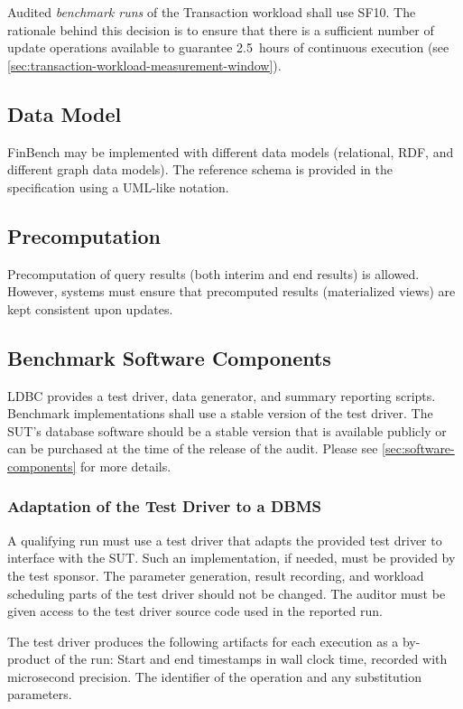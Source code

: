 Audited \emph{benchmark runs} of the Transaction workload shall use SF10. The rationale behind this decision is to ensure that there is a sufficient number of update operations available to guarantee 2.5~hours of continuous execution (see \autoref{sec:transaction-workload-measurement-window}).

\subsection{Data Model}

FinBench may be implemented with different data models (\eg relational, RDF, and different graph data models). The reference schema is provided in the specification using a UML-like notation.

\subsection{Precomputation}

Precomputation of query results (both interim and end results) is allowed. However, systems must ensure that precomputed results (\eg materialized views) are kept consistent upon updates.

\subsection{Benchmark Software Components}
\label{sec:finbench-software-components}
LDBC provides a test driver, data generator, and summary reporting scripts. Benchmark implementations shall use a stable
version of the test driver. The SUT's database software should be a stable version that is available publicly or can be
purchased at the time of the release of the audit. Please see \autoref{sec:software-components} for more details.

\subsubsection{Adaptation of the Test Driver to a DBMS}
\label{sec:test-driver}
A qualifying run must use a test driver that adapts the provided test driver to interface with the SUT. Such an implementation, if needed, must be provided by the test sponsor. The parameter generation, result recording, and workload scheduling parts of the test driver should not be changed. The auditor must be given access to the test driver source code used in the reported run.

The test driver produces the following artifacts for each execution as a by-product of the run: Start and end timestamps in wall clock time, recorded with microsecond precision. The identifier of the operation and any substitution parameters.


